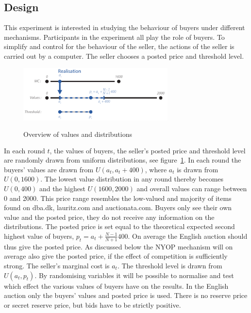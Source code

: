 \documentclass[a4paper,12pt]{article}
\begin{document}
	\subsection{Design}
	\label{sec:design}

	This experiment is interested in studying the behaviour of buyers under different mechanisms. Participants in the experiment all play the role of buyers. To simplify and control for the behaviour of the seller, the actions of the seller is carried out by a computer. The seller chooses a posted price and threshold level.

	\begin{figure}[h]
	        \centering
	        \caption{Overview of values and distributions}
	        \includegraphics[width=0.7\textwidth]{Figures/Distribution}
			\label{fig:distribution}
	\end{figure}

	In each round $t$, the values of buyers, the seller's posted price and threshold level are randomly drawn from uniform distributions, see figure~\ref{fig:distribution}. In each round the buyers' values are drawn from $U(a_t , a_t + 400)$, where $a_t$ is drawn from $U(0, 1600)$. The lowest value distribution in any round thereby becomes $U(0, 400)$ and the highest $U(1600, 2000)$ and overall values can range between 0 and 2000. This price range resembles the low-valued and majority of items found on dba.dk, lauritz.com and auctionata.com. Buyers only see their own value and the posted price, they do not receive any information on the distributions. The posted price is set equal to the theoretical expected second highest value of buyers, $p_t = a_t + \frac{N-1}{N+1}400$. On average the English auction should thus give the posted price. As discussed below the NYOP mechanism will on average also give the posted price, if the effect of competition is sufficiently strong. The seller's marginal cost is $a_t$. The threshold level is drawn from $U(a_t, p_t)$. By randomising variables it will be possible to normalise and test which effect the various values of buyers have on the results. In the English auction only the buyers' values and posted price is used. There is no reserve price or secret reserve price, but bids have to be strictly positive.
	
\end{document}
